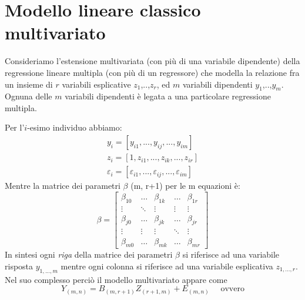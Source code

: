 \documentclass[a4page, 11pt]{article} %
\begin{document}
\section{Modello lineare classico multivariato}

Consideriamo l’estensione multivariata (con più di una variabile dipendente) della regressione lineare multipla (con più di un regressore) che modella la relazione fra un insieme di $r$ variabili esplicative $z_1$,..,$z_r$, ed $m$ variabili dipendenti $y_1$,..,$y_m$. Ognuna delle $m$ variabili dipendenti è legata a una particolare regressione multipla. 

Per l'$i$-esimo individuo abbiamo:
\begin{align*}
y_i = [y_{i1},...,y_{ij},...,y_{im}]\\
z_i = [1,z_{i1},...,z_{ik},...,z_{ir}]\\
\varepsilon_i = [\varepsilon_{i1},...,\varepsilon_{ij},...,\varepsilon_{im}]
\end{align*}
Mentre la matrice dei parametri $\beta$ (m, r+1) per le m equazioni è:
\[
\beta =
\begin{bmatrix}
\beta_{10} & \dots & \beta_{1k} & \dots & \beta_{1r} \\
\vdots& \ddots & \vdots& \vdots & \vdots \\
\beta_{j0} & \dots & \beta_{jk} & \dots & \beta_{jr} \\
\vdots& \vdots& \vdots &\ddots & \vdots \\
\beta_{m0} & \dots & \beta_{mk} & \dots & \beta_{mr} 
\end{bmatrix}
\]
In sintesi ogni \textit{riga} della matrice dei parametri $\beta$ si riferisce ad una variabile risposta $y_{1,...,m}$ mentre ogni colonna si riferisce ad una variabile esplicativa $z_{1,...,r}$. 
\newline
Nel suo complesso perciò il modello multivariato appare come 
\[ Y_{(m,n)} = B_{(m,r+1)}Z_{(r+1,m)} + E_{(m,n)} \quad \text{ ovvero}\]
\end{document}

